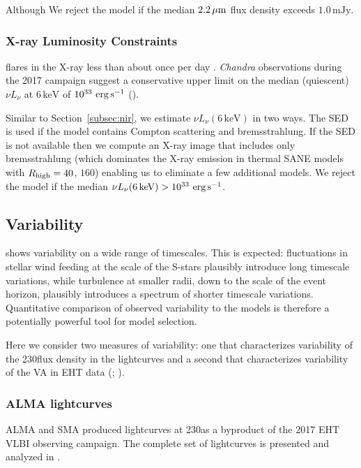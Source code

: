 Although  We reject the model if the median $2.2\,\mu\mathrm{m}$ flux density exceeds $1.0\,\mathrm{mJy}$.

\subsubsection{X-ray Luminosity Constraints}

\sgra flares in the X-ray less than about once per day \citep[see][and references therein]{2018MNRAS.473..306Y}.
\emph{Chandra} observations during the 2017 campaign suggest a conservative upper limit on the median (quiescent) $\nu L_\nu$ at $6\,\mathrm{keV}$ of $10^{33}\,\,\mathrm{erg}\,\mathrm{s}^{-1}$ ().

Similar to Section~\ref{subsec:nir}, we estimate $\nu L_\nu(6\,\mathrm{keV})$ in two ways.  The SED is used if the model contains Compton scattering and bremsstrahlung.  If the SED is not available then we compute an X-ray image that includes only bremsstrahlung (which dominates the X-ray emission in thermal SANE models with $R_\mathrm{high} = 40$, $160$) enabling us to eliminate a few additional models.  We reject the model if the median $\nu L_\nu(6\,\mathrm{keV}) > 10^{33}\,\,\mathrm{erg}\,\mathrm{s}^{-1}$.


\subsection{Variability}

\sgra shows variability on a wide range of timescales.  This is expected: fluctuations in stellar wind feeding at the scale of the S-stars plausibly introduce long timescale variations, while turbulence at smaller radii, down to the scale of the event horizon, plausibly introduces a spectrum of shorter timescale variations.  Quantitative comparison of observed variability to the models is therefore a potentially powerful tool for model selection.

Here we consider two measures of variability: one that characterizes variability of the 230\GHz flux density in the lightcurves \citep{Wielgus2022} and a second that characterizes variability of the VA in EHT data (; \citealt{NoiseModeling}).


\subsubsection{ALMA lightcurves}

ALMA and SMA produced \sgra lightcurves at 230\GHz as a byproduct of the 2017 EHT VLBI observing campaign. The complete set of lightcurves is presented and analyzed in \cite{Wielgus2022}.


